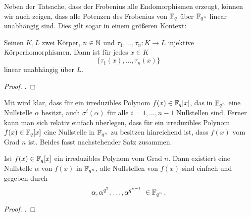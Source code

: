 Neben der Tatsache, dass der Frobenius alle Endomorphismen erzeugt, können wir
auch zeigen, dass alle Potenzen des Frobenius von $\mathbb{F}_q$ über $\mathbb{F}_{q^n}$ linear
unabhängig sind. Dies gilt sogar in einem größeren Kontext:

\begin{satz}
  \label{satz:dedekindsches_lemma}
  Seinen $K,L$ zwei Körper, $n \in \mathbb{N}$ und $\tau_1,\ldots,\tau_n: K\to L$
  injektive Körperhomorphismen. Dann ist für jedes $x \in K$
  \[ \{\tau_1(x),\ldots,\tau_n(x) \}\]
  linear unabhängig über $L$.
\end{satz}
\begin{proof}
  \autocite[Satz 27.2]{karpfinger2010algebra}.
\end{proof}


Mit  wird klar, dass für ein
irreduzibles Polynom $f(x) \in \mathbb{F}_q[x]$, das in $\mathbb{F}_{q^n}$ eine Nullstelle 
$\alpha$ besitzt, auch $\sigma^i(\alpha)$ für alle $i=1,\ldots,n-1$
Nullstellen sind. 
Ferner kann man sich relativ einfach überlegen, dass
für ein irreduzibles Polynom $f(x)\in \mathbb{F}_q[x]$ eine Nullstelle 
in $\mathbb{F}_{q^n}$ zu besitzen hinreichend ist, dass $f(x)$ vom Grad $n$ ist. 
Beides fasst nachstehender Satz zusammen.

\begin{satz}
  \label{satz:nst_irred_polys}
  Ist $f(x) \in \mathbb{F}_q[x]$ ein irreduzibles Polynom vom Grad $n$. Dann 
  existiert eine Nullstelle $\alpha$ von $f(x)$ in $\mathbb{F}_{q^n}$, alle 
  Nullstellen von $f(x)$ sind einfach und gegeben durch
  \[ \alpha, \alpha^{q^2}, \ldots, \alpha^{q^{n-1}}\ \in \mathbb{F}_{q^n}\,.\]
\end{satz}
\begin{proof}
  \autocite[Theorem 2.14]{lidl1997finite}.
\end{proof}

